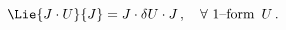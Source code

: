 \begin{equation}\label{eq:Jac}
  \Lie{J\cdot U}{J} = J\cdot \delta U\cdot J\,,\quad \forall \,\,1\textrm{--form }\,U\,.
\end{equation}

